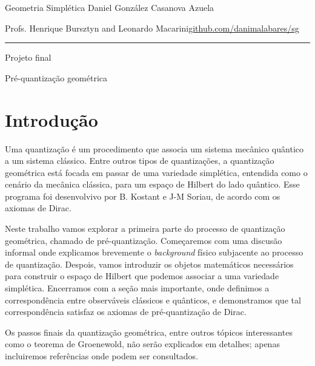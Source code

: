 
\usepackage[style=authortitle-terse,backend=bibtex]{biblatex}




\begin{minipage}{\textwidth}
	\begin{minipage}{1\textwidth}
		Geometria Simplética \hfill Daniel González Casanova Azuela
		
		{\small Profs. Henrique Bursztyn and Leonardo Macarini\hfill\href{https://github.com/danimalabares/sg}{github.com/danimalabares/sg}}
	\end{minipage}
\end{minipage}\vspace{.2cm}\hrule

\vspace{10pt}
{\large Projeto final}

{\huge Pré-quantização geométrica}

\tableofcontents

\section{Introdução}

Uma quantização é um procedimento que associa um sistema mecânico quântico a um sistema clássico. Entre outros tipos de quantizações, a quantização geométrica está focada em passar de uma variedade simplética, entendida como o cenário da mecânica clássica, para um espaço de Hilbert do lado quântico. Esse programa foi desenvolvivo por B. Kostant e J-M Soriau, de acordo com os axiomas de Dirac.

Neste trabalho vamos explorar a primeira parte do processo de quantização geométrica, chamado de pré-quantização. Começaremos com uma discusão informal onde explicamos brevemente o \textit{background} físico subjacente ao processo de quantização. Despois, vamos introduzir os objetos matemáticos necessários para construir o espaço de Hilbert que podemos associar a uma variedade simplética. Encerramos com a seção mais importante, onde definimos a correspondência entre observáveis clássicos e quânticos, e demonstramos que tal correspondência satisfaz os axiomas de pré-quantização de Dirac.

Os passos finais da quantização geométrica, entre outros tópicos interessantes como o teorema de Groenewold, não serão explicados em detalhes; apenas incluiremos referências onde podem ser consultados.

